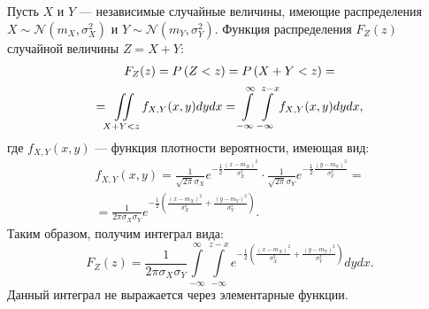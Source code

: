 Пусть $X$ и $Y$ --- независимые случайные величины, имеющие распределения $X \sim \mathcal{N} \left ( m_X, \sigma_X^2 \right )$ и
$Y \sim \mathcal{N} \left ( m_Y, \sigma_Y^2 \right )$. Функция распределения $F_Z(z)$ случайной величины $Z = X + Y$:
\begin{multline}
    F_Z(z)
    = P \left ( Z < z \right )
    = P \left ( X + Y < z \right ) = \\
    = \iint \limits_{X + Y < z} f_{X,Y}(x,y) dy dx
    = \int \limits_{-\infty}^\infty \int \limits_{-\infty}^{z-x} f_{X,Y}(x,y) dy dx,
\end{multline}
где $f_{X,Y}(x,y)$ --- функция плотности вероятности, имеющая вид:
\begin{multline}
    f_{X,Y}(x,y)
    = \frac{1}{\sqrt{2 \pi} \sigma_X} e^{- \frac{1}{2} \frac{(x - m_X)^2}{\sigma_X^2}} \cdot \frac{1}{\sqrt{2 \pi} \sigma_Y} e^{- \frac{1}{2} \frac{(y - m_Y)^2}{\sigma_Y^2}} = \\
    = \frac{1}{2 \pi \sigma_X \sigma_Y} e^{- \frac{1}{2} \left ( \frac{(x - m_X)^2}{\sigma_X^2} + \frac{(y - m_Y)^2}{\sigma_Y^2} \right )} .
\end{multline}
Таким образом, получим интеграл вида:
\begin{equation}
    F_Z(z)
    = \frac{1}{2 \pi \sigma_X \sigma_Y} \int \limits_{-\infty}^\infty \int \limits_{-\infty}^{z-x} e^{- \frac{1}{2} \left ( \frac{(x - m_X)^2}{\sigma_X^2} + \frac{(y - m_Y)^2}{\sigma_Y^2} \right )} dy dx .
\end{equation}
Данный интеграл не выражается через элементарные функции.

